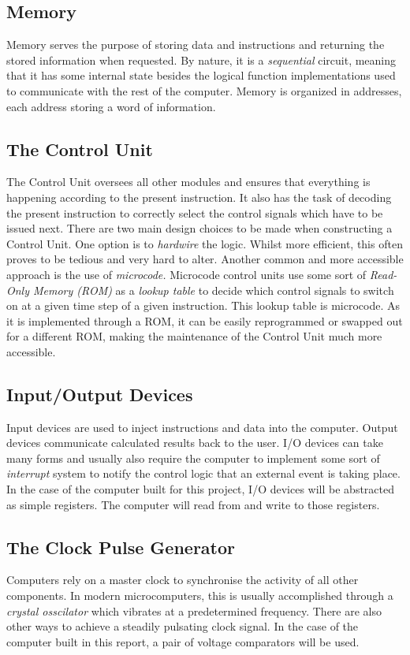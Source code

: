 \subsection{Memory}
Memory serves the purpose of storing data and instructions and returning the stored information when requested. By nature, it is a \emph{sequential} circuit, meaning that it has some internal state besides the logical function implementations used to communicate with the rest of the computer. Memory is organized in addresses, each address storing a word of information.

\subsection{The Control Unit}
The Control Unit oversees all other modules and ensures that everything is happening according to the present instruction. It also has the task of decoding the present instruction to correctly select the control signals which have to be issued next.
There are two main design choices to be made when constructing a Control Unit. One option is to \emph{hardwire} the logic. Whilst more efficient, this often proves to be tedious and very hard to alter. Another common and more accessible approach is the use of \emph{microcode.} Microcode control units use some sort of \emph{Read-Only Memory (ROM)} as a \emph{lookup table} to decide which control signals to switch on at a given time step of a given instruction. This lookup table is microcode. As it is implemented through a ROM, it can be easily reprogrammed or swapped out for a different ROM, making the maintenance of the Control Unit much more accessible.

\subsection{Input/Output Devices}
Input devices are used to inject instructions and data into the computer. Output devices communicate calculated results back to the user. I/O devices can take many forms and usually also require the computer to implement some sort of \emph{interrupt} system to notify the control logic that an external event is taking place. In the case of the computer built for this project, I/O devices will be abstracted as simple registers. The computer will read from and write to those registers.

\subsection{The Clock Pulse Generator}
Computers rely on a master clock to synchronise the activity of all other components. In modern microcomputers, this is usually accomplished through a \emph{crystal osscilator} which vibrates at a predetermined frequency. There are also other ways to achieve a steadily pulsating clock signal. In the case of the computer built in this report, a pair of voltage comparators will be used.

